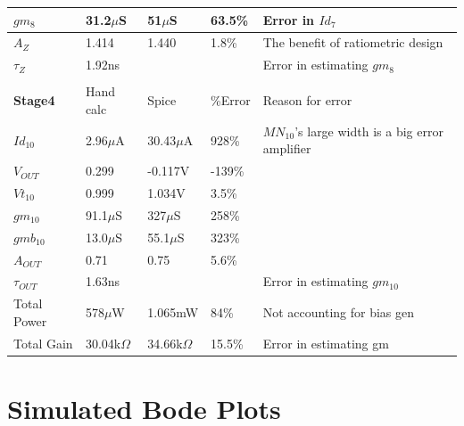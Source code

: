 \documentclass[12pt,a4paper]{article}
\begin{document}
\begin{table}[h]
\begin{tabular}{|l|l|l|l|l|}
\hline
$gm_8$ & 31.2$\mu$S & 51$\mu$S   &  63.5\% &  Error in $Id_7$  \\
\hline
$A_Z$ & 1.414  & 1.440  & 1.8\%  &  The benefit of ratiometric design \\
\hline
$\tau_Z$ & 1.92ns  &   &   &  Error in estimating $gm_{8}$ \\
\hline
  &   &   &   &   \\
\hline
\textbf{Stage4} & Hand calc & Spice & \%Error & Reason for error \\
\hline
$Id_{10}$ & 2.96$\mu$A  &  30.43$\mu$A &  928\% & $MN_{10}$'s large width is a big error amplifier  \\
\hline
$V_{OUT}$ & 0.299 & -0.117V  &  -139\% &   \\
\hline
$Vt_{10}$ & 0.999  & 1.034V  &  3.5\% &   \\
\hline
$gm_{10}$ & 91.1$\mu$S   &  327$\mu$S  & 258\%  &   \\
\hline
$gmb_{10}$ & 13.0$\mu$S  &  55.1$\mu$S  & 323\%  &   \\
\hline
$A_{OUT}$ & 0.71 & 0.75  & 5.6\%  &   \\
\hline
$\tau_{OUT}$ & 1.63ns  &   &   & Error in estimating $gm_{10}$  \\

\hline
Total Power &  578$\mu$W & 1.065mW  & 84\%  & Not accounting for bias gen  \\
\hline
Total Gain & 30.04k$\Omega$  & 34.66k$\Omega$   &  15.5\% & Error in estimating gm  \\
\hline
\end{tabular}
\end{table}

\pagebreak



\section{Simulated Bode Plots}
\end{document}
